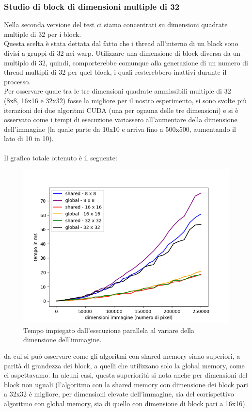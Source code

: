 \documentclass[10pt,twocolumn,letterpaper]{article}
\begin{document}
\subsubsection{Studio di block di dimensioni multiple di 32}
Nella seconda versione del test ci siamo concentrati su dimensioni quadrate multiple di 32 per i block.\\
Questa scelta è stata dettata dal fatto che i thread all'interno di un block sono divisi a gruppi di 32 nei warp. Utilizzare una dimensione di block diversa da un multiplo di 32, quindi, comporterebbe comunque alla generazione di un numero di thread multipli di 32 per quel block, i quali resterebbero inattivi durante il processo.\\
Per osservare quale tra le tre dimensioni quadrate ammissibili multiple di 32 (8x8, 16x16 e 32x32) fosse la migliore per il nostro esperimento, si sono svolte più iterazioni dei due algoritmi CUDA (una per ognuna delle tre dimensioni) e si è osservato come i tempi di esecuzione variassero all'aumentare della dimensione dell'immagine (la quale parte da 10x10 e arriva fino a 500x500, aumentando il lato di 10 in 10).\\
\\
Il grafico totale ottenuto è il seguente:
\begin{figure}[H]
\includegraphics[width=0.9\linewidth]{test/gridTest/mul32/result.png} 
\caption{\small Tempo impiegato dall'esecuzione parallela al variare della dimensione dell'immagine.}
\label{t2_3}
\end{figure}
da cui si può osservare come gli algoritmi con shared memory siano superiori, a parità di grandezza dei block, a quelli che utilizzano solo la global memory, come ci aspettavamo. In alcuni casi, questa superiorità si nota anche per dimensioni del block non uguali (l'algoritmo con la shared memory con dimensione dei block pari a 32x32 è migliore, per dimensioni elevate dell'immagine, sia del corrispettivo algoritmo con global memory, sia di quello con dimensione di block pari a 16x16).\\
\end{document}
